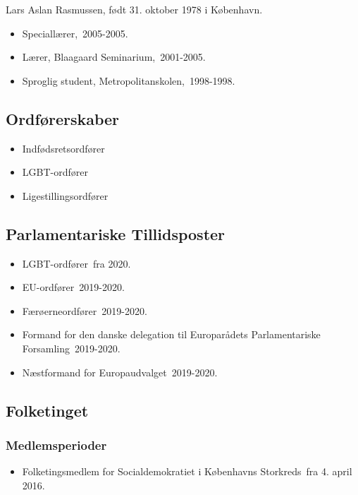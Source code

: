 \documentclass[11pt, a4paper]{awesome-cv}
\begin{document}
\makecvheader[R]
\makelettertitle
\begin{cvletter}
Lars Aslan Rasmussen, født 31. oktober 1978 i København.

\begin{itemize}
\item Speciallærer, 2005-2005.
\item Lærer, Blaagaard Seminarium, 2001-2005.
\item Sproglig student, Metropolitanskolen, 1998-1998.
\end{itemize}
\subsection*{Ordførerskaber}
\begin{itemize}
\item Indfødsretsordfører
\item LGBT-ordfører
\item Ligestillingsordfører
\end{itemize}
\subsection*{Parlamentariske Tillidsposter}
\begin{itemize}
\item LGBT-ordfører fra 2020.
\item EU-ordfører 2019-2020.
\item Færøerneordfører 2019-2020.
\item Formand for den danske delegation til Europarådets Parlamentariske Forsamling 2019-2020.
\item Næstformand for Europaudvalget 2019-2020.
\end{itemize}
\subsection*{Folketinget}
\subsubsection*{Medlemsperioder}
\begin{itemize}
\item Folketingsmedlem for Socialdemokratiet i Københavns Storkreds fra 4. april 2016.
\end{itemize}

\end{cvletter}
\end{document}
